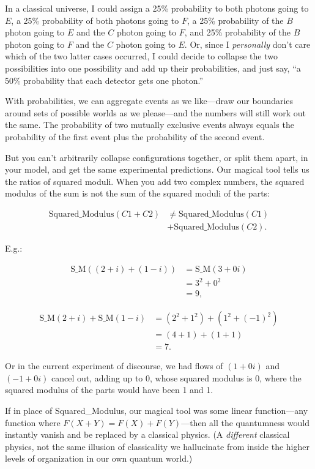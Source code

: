 {
 In a classical universe, I could assign a 25\% probability to both
photons going to $E$, a 25\% probability of both photons going to $F$, a
25\% probability of the $B$ photon going to $E$ and the $C$ photon going to
$F$, and 25\% probability of the $B$ photon going to $F$ and the $C$ photon
going to $E$. Or, since I \textit{personally} don't care
which of the two latter cases occurred, I could decide to collapse the
two possibilities into one possibility and add up their probabilities,
and just say, ``a 50\% probability that each detector
gets one photon.''}

{
 With probabilities, we can aggregate events as we like---draw our
boundaries around sets of possible worlds as we please---and the
numbers will still work out the same. The probability of two mutually
exclusive events always equals the probability of the first event plus
the probability of the second event.}

{
 But you can't arbitrarily collapse configurations
together, or split them apart, in your model, and get the same
experimental predictions. Our magical tool tells us the ratios of
squared moduli. When you add two complex numbers, the squared modulus
of the sum is not the sum of the squared moduli of the parts:}

\begin{align*}
 \text{Squared\_Modulus}(C1 + C2) &\neq \text{Squared\_Modulus}(C1)\\ &+
\text{Squared\_Modulus}(C2).
\end{align*}

{
 E.g.:}

\begin{align*}
\text{S\_M}((2 + i) + (1 - i)) &= \text{S\_M}(3 + 0i)\\
 &= 3^2 + 0^2\\
 &= 9,
\end{align*}


\begin{align*}
 \text{S\_M}(2 + i) + \text{S\_M}(1 - i) &= (2^2 + 1^2)+ ( 1^2 + (-1)^2)\\
 &= (4 + 1) + (1 + 1)\\
 &= 7.
\end{align*}



{
 Or in the current experiment of discourse, we had flows of $(1 +
0i)$ and $(-1 + 0i)$ cancel out, adding up to 0, whose squared modulus is
0, where the squared modulus of the parts would have been 1 and 1.}

{
 If in place of Squared\_Modulus, our magical tool was some linear
function---any function where $F(X + Y) = F(X) + F(Y)$---then all the
quantumness would instantly vanish and be replaced by a classical
physics. (A \textit{different} classical physics, not the same illusion
of classicality we hallucinate from inside the higher levels of
organization in our own quantum world.)}

